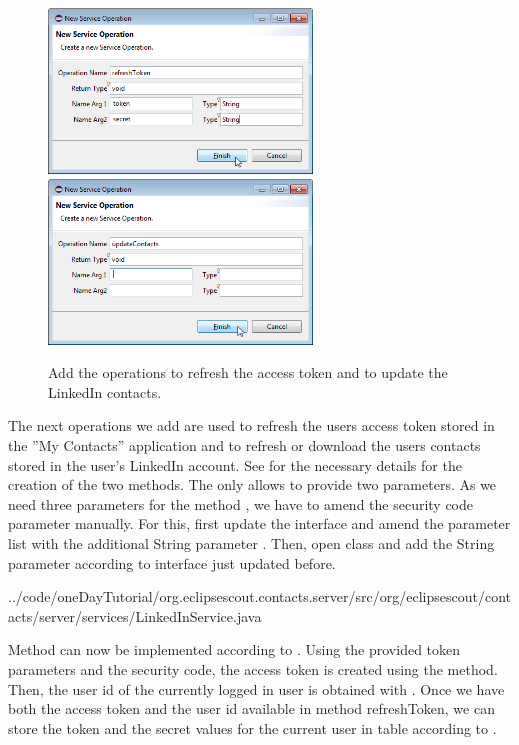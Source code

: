 \documentclass[a4paper,10pt,twoside]{book}
\begin{document}
\begin{figure}
\includegraphics[width=7cm]{new_operation_refreshtoken.png} \hspace{5mm}
\includegraphics[width=7cm]{new_operation_updatecontacts.png}
\caption{Add the operations to refresh the access token and to update the LinkedIn contacts.}
\end{figure}

The next operations we add are used to refresh the users access token stored in the ''My Contacts'' application and to refresh or download the users contacts stored in the user's LinkedIn account. 
See  for the necessary details for the creation of the two methods. 
The  only allows to provide two parameters. 
As we need three parameters for the method , we have to amend the security code parameter manually. 
For this, first update the interface  and amend the parameter list with the additional String parameter . 
Then, open class  and add the String parameter  according to interface just updated before.


{../code/oneDayTutorial/org.eclipsescout.contacts.server/src/org/eclipsescout/contacts/server/services/LinkedInService.java}

Method  can now be implemented according to . 
Using the provided token parameters and the security code, the access token is created using the  method. 
Then, the user id of the currently logged in user is obtained with . 
Once we have both the access token and the user id available in method {refreshToken}, we can store the token and the secret values for the current user in table  according to .
\end{document}
